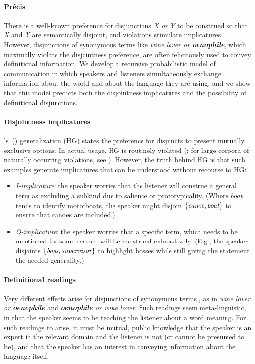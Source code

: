 \documentclass[12pt]{article}
\newcommand{\word}[1]{\emph{#1}}
\newcommand{\tech}[1]{\emph{#1}}
\newcommand{\set}[1]{\ensuremath{\left\{#1\right\}}}
\newcommand{\posscitet}[1]{\citeauthor{#1}'s~(\citeyear{#1})}
\begin{document}
\paragraph{Pr{\'e}cis}
There is a well-known preference for disjunctions \word{X or Y} to be
construed so that \word{X} and \word{Y} are semantically disjoint, and
violations stimulate implicatures.  However, disjunctions of
synonymous terms like \word{wine lover or \textbf{oenophile}}, which
maximally violate the disjointness preference, are often felicitously
used to convey definitional information. We develop a recursive
probabilistic model of communication in which speakers and listeners
simultaneously exchange information about the world and about the
language they are using, and we show that this model predicts both the
disjointness implicatures and the possibility of definitional
disjunctions.

\paragraph{Disjointness implicatures}
\posscitet{Hurford:1974} generalization (HG) states
the preference for disjuncts to present mutually exclusive options. In
actual usage, HG is routinely violated (\citealt{Rohdenburg:1985}; for
large corpora of naturally occurring violations, see
\citealt{Potts13MICH,Chemla-HurfordCounts}).  However, the truth
behind HG is that such examples generate implicatures
that can be understood without recourse to HG:

\begin{itemize}
\item \tech{I-implicature}: the speaker worries that the listener will
  construe a general term as excluding a subkind due to salience or
  prototypicality. (Where \word{boat} tends to identify motorboats,
  the speaker might disjoin \set{\word{canoe}, \word{boat}} to ensure
  that canoes are included.)

\item \tech{Q-implicature}: the speaker worries that a specific term,
  which needs to be mentioned for some reason, will be construed
  exhaustively. (E.g., the speaker disjoints \set{\word{boss},
    \word{supervisor}} to highlight bosses while still giving the
  statement the needed generality.)
\end{itemize}

\paragraph{Definitional readings} Very different effects arise for
disjunctions of synonymous terms \citep{Horn89,Rohdenburg:1985}, as in
\word{wine lover or \textbf{oenophile}} and \word{\textbf{oenophile}
  or wine lover}. Such readings seem meta-linguistic, in that the
speaker seems to be teaching the listener about a word meaning. For
such readings to arise, it must be mutual, public knowledge that the
speaker is an expert in the relevant domain and the listener is not
(or cannot be presumed to be), and that the speaker has an interest in
conveying information about the language itself.
\end{document}
